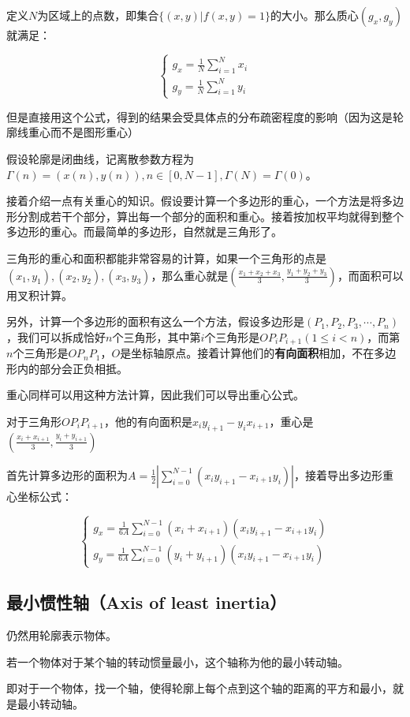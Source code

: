 \documentclass{ctexart}
\begin{document}
定义$N$为区域上的点数，即集合$\{(x,y)|f(x,y)=1\}$的大小。那么质心$(g_x,g_y)$就满足：

\[\begin{cases}g_x=\frac{1}{N}\sum\limits_{i=1}^Nx_i \\ g_y=\frac{1}{N}\sum\limits_{i=1}^Ny_i\end{cases}\]

但是直接用这个公式，得到的结果会受具体点的分布疏密程度的影响（因为这是轮廓线重心而不是图形重心）

假设轮廓是闭曲线，记离散参数方程为$\Gamma(n)=(x(n),y(n)),n \in [0,N-1],\Gamma(N)=\Gamma(0)$。

接着介绍一点有关重心的知识。假设要计算一个多边形的重心，一个方法是将多边形分割成若干个部分，算出每一个部分的面积和重心。接着按加权平均就得到整个多边形的重心。而最简单的多边形，自然就是三角形了。

三角形的重心和面积都能非常容易的计算，如果一个三角形的点是$(x_1,y_1),(x_2,y_2),(x_3,y_3)$，那么重心就是$(\frac{x_1+x_2+x_3}{3},\frac{y_1+y_2+y_3}{3})$，而面积可以用叉积计算。

另外，计算一个多边形的面积有这么一个方法，假设多边形是$(P_1,P_2,P_3,\cdots,P_n)$，我们可以拆成恰好$n$个三角形，其中第$i$个三角形是$OP_iP_{i+1}(1 \le i < n)$，而第$n$个三角形是$OP_nP_1$，$O$是坐标轴原点。接着计算他们的\textbf{有向面积}相加，不在多边形内的部分会正负相抵。

重心同样可以用这种方法计算，因此我们可以导出重心公式。

对于三角形$OP_iP_{i+1}$，他的有向面积是$x_iy_{i+1}-y_ix_{i+1}$，重心是$(\frac{x_i+x_{i+1}}{3},\frac{y_i+y_{i+1}}{3})$

首先计算多边形的面积为$A=\frac{1}{2}|\sum\limits_{i=0}^{N-1}(x_iy_{i+1}-x_{i+1}y_i)|$，接着导出多边形重心坐标公式：

\[\begin{cases}g_x =\frac{1}{6A}\sum\limits_{i=0}^{N-1}(x_i+x_{i+1})(x_iy_{i+1}-x_{i+1}y_i) \\ g_y  = \frac{1}{6A}\sum\limits_{i=0}^{N-1}(y_i+y_{i+1})(x_iy_{i+1}-x_{i+1}y_i)\end{cases}\]
\subsection{最小惯性轴（Axis of least inertia）}
仍然用轮廓表示物体。

若一个物体对于某个轴的转动惯量最小，这个轴称为他的最小转动轴。

即对于一个物体，找一个轴，使得轮廓上每个点到这个轴的距离的平方和最小，就是最小转动轴。
\end{document}
